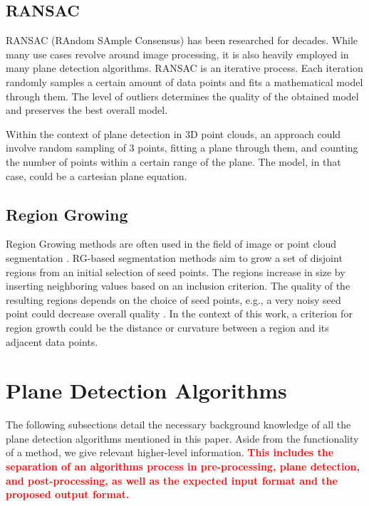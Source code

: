 \documentclass[main.tex]{subfiles}
\begin{document}
\subsection*{RANSAC}
RANSAC (RAndom SAmple Consensus) has been researched for decades. While many use cases revolve around image processing, it is also heavily employed in many plane detection algorithms\cite{Sun_Mordohai_2019, Yang_Forstner, Ashraf_Ahmed_2017}.
RANSAC is an iterative process. Each iteration randomly samples a certain amount of data points and fits a mathematical model through them. The level of outliers determines the quality of the obtained model and preserves the best overall model.

Within the context of plane detection in 3D point clouds, an approach could involve random sampling of 3 points, fitting a plane through them,
and counting the number of points within a certain range of the plane\cite{Yang_Forstner}. The model, in that case, could be a cartesian plane equation.

\subsection*{Region Growing}
Region Growing methods are often used in the field of image or point cloud segmentation \cite{Proença_Gao_2018, Vo_Truong-Hong_Laefer_Bertolotto_2015}.
RG-based segmentation methods aim to grow a set of disjoint regions from an initial selection of seed points. The regions increase in size by inserting neighboring values based on an inclusion criterion.
The quality of the resulting regions depends on the choice of seed points, e.g., a very noisy seed point could decrease overall quality  \cite{Malek_Rahman_Yasiran_Jumaat_Jalil_2012}.
In the context of this work, a criterion for region growth could be the distance or curvature between a region and its adjacent data points.

\section{Plane Detection Algorithms}
The following subsections detail the necessary background knowledge of all the plane detection algorithms mentioned in this paper.
Aside from the functionality of a method, we give relevant higher-level information. \textbf{\textcolor{red}{This includes the separation of an algorithms
        process in pre-processing, plane detection, and post-processing, as well as the expected input format and the proposed output format.}}
\end{document}
